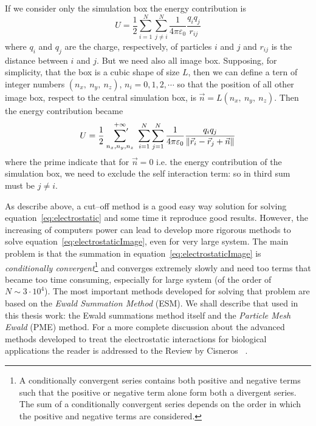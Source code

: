If we consider only the simulation box the energy contribution is
\begin{equation}
	U = \frac{1}{2}\sum_{i=1}^N\sum_{j\ne i}^N\frac{1}{4\pi\varepsilon_0}\frac{q_iq_j}{r_{ij}}
	\label{eq:electrostatic}
\end{equation}
where $q_i$ and $q_j$ are the charge, respectively, of particles $i$ and $j$ and $r_{ij}$ is the distance between $i$ and $j$. But we need also all image box. Supposing, for simplicity, that the box is a cubic shape of size $L$, then we can define a tern of integer numbers $(n_x,\ n_y,\ n_z)$, $n_i=0,1,2,\cdots$ so that the position of all other image box, respect to the central simulation box, is $\vec n = L (n_x,\ n_y,\ n_z)$. Then the energy contribution became
\begin{equation}
	U = \frac{1}{2}\ \sideset{}{'}\sum_{n_x,n_y,n_z}^{+\infty}\ \sum_{i=1}^N\sum_{j=1}^N\frac{1}{4\pi\varepsilon_0}\frac{q_iq_j}{\|\vec r_i - \vec r_j + \vec n \|}
	\label{eq:electrostaticImage}
\end{equation}
where the prime indicate that for $\vec n = 0$ i.e. the energy contribution of the simulation box, we need to exclude the self interaction term: so in third sum must be $j \ne i$.

As describe above, a cut--off method is a good easy way solution for solving equation~\eqref{eq:electrostatic} and some time it reproduce good results. However, the increasing of computers power can lead to develop more rigorous methods to solve equation~\eqref{eq:electrostaticImage}, even for very large system. The main problem is that the summation in equation~\eqref{eq:electrostaticImage} is \textit{conditionally convergent}\footnote{A conditionally convergent series contains both positive and negative terms such that the positive or negative term alone form both a divergent series. The sum of a conditionally convergent series depends on the order in which the positive and negative terms are considered.} and converges extremely slowly and need too terms that became too time consuming, especially for large system (of the order of $N \sim 3\cdot 10^4$). The most important methods developed for solving that problem are based on the \textit{Ewald Summation Method} (\acs{ESM}). We shall describe that used in this thesis work: the Ewald summations method itself and the \textit{Particle Mesh Ewald} (\acs{PME}) method. For a more complete discussion about the advanced methods developed to treat the electrostatic interactions for biological applications the reader is addressed to the Review by Cisneros \etal\, \cite{Cisneros}.

